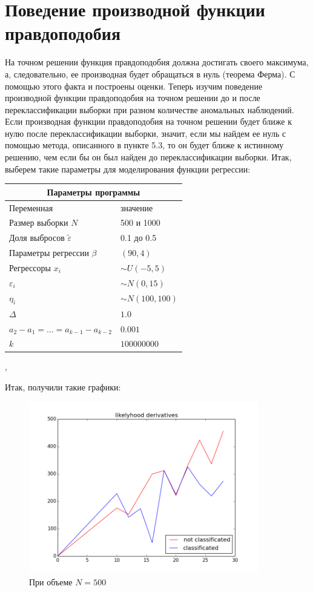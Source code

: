 \documentclass[12pt]{article}
\begin{document}
\section{Поведение производной функции правдоподобия}
На точном решении функция правдоподобия должна достигать своего максимума, а, следовательно, ее производная будет обращаться в нуль (теорема Ферма). 
С помощью этого факта и построены оценки. Теперь изучим поведение производной функции правдоподобия на точном решении до и после переклассификации выборки при разном количестве аномальных наблюдений.
Если производная функции правдоподобия на точном решении будет ближе к нулю после переклассификации выборки, значит, если мы найдем ее нуль с помощью метода, описанного в пункте 5.3, то он будет ближе к истинному решению,
 чем если бы он был найден до переклассификации выборки.
Итак, выберем такие параметры для моделирования функции регрессии:
\begin{center}
    \begin{tabular}{|p{5cm}|p{5cm}|}
        \hline
        \multicolumn{2}{|c|}{Параметры программы} \\
        \hline
        Переменная&значение\\
        \hline
        Размер выборки $N$& 500 и 1000\\
        \hline
        Доля выбросов $\widetilde{\varepsilon}$& 0.1 до 0.5\\
        \hline
        Параметры регрессии $\beta$& $(90,4)$\\
        \hline
        Регрессоры $x_i$ & $\sim U(-5,5)$\\
        \hline
        $\varepsilon_i$&$\sim N(0,15)$\\
        \hline
        $\eta_i$&$\sim N(100,100)$\\
        \hline
        $\Delta$&$1.0$\\
        \hline
        $a_2-a_1=\dots=a_{k-1}-a_{k-2}$&$0.001$\\
        \hline
        $k$&$100 000 000$\\
        \hline
    \end{tabular},
\end{center}
Итак, получили такие графики:\hfill\break
\begin{figure}[ht!]
    \centering
    \includegraphics[width=100mm]{likelyhood_derivatives_100perc.png}
    \caption{При объеме $N=500$\label{overflow}}
\end{figure}
\end{document}
